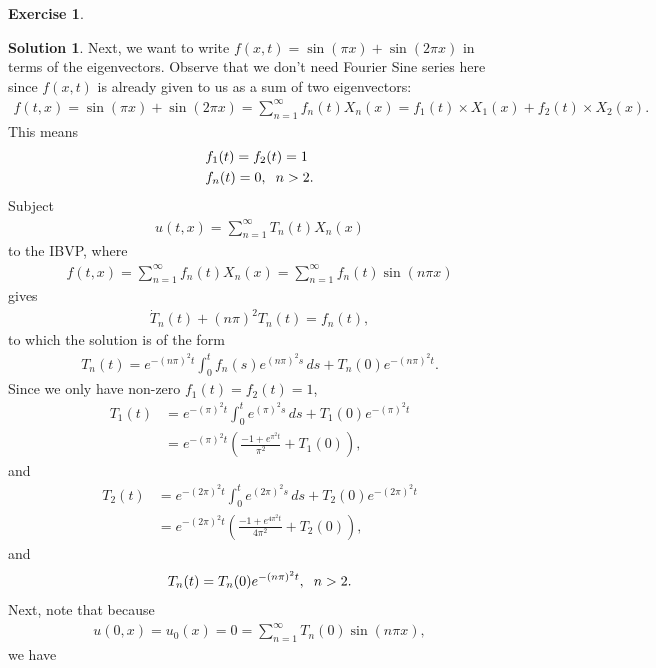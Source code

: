 \documentclass{book}
\theoremstyle{definition}
\newtheorem*{exer*}{Exercise}
\newtheorem*{sln*}{Solution}
\begin{document}
\begin{exer*}
\begin{sln*}
		Next, we want to write $f(x,t) = \sin(\pi x) + \sin(2\pi x)$ in terms of the eigenvectors. Observe that we don't need Fourier Sine series here since $f(x,t)$ is already given to us as a sum of two eigenvectors:
		\begin{align*}
		f(t,x) = \sin(\pi x) + \sin(2\pi x) = \sum^\infty_{n=1}f_n(t)X_n(x) = f_1(t) \times X_1(x) + f_2(t) \times X_2(x).
		\end{align*}
		This means
		\begin{align*}
		&f_1(t) = f_2(t) = 1\\
		&f_n(t) = 0, \hspace{0.2cm}n > 2.
		\end{align*}
		Subject 
		\begin{align*}
		u(t,x) = \sum^\infty_{n=1} T_n(t)X_n(x)
		\end{align*}
		to the IBVP, where
		\begin{align*}
		f(t,x) = \sum^\infty_{n=1}f_n(t)X_n(x) = \sum^\infty_{n=1}f_n(t)\sin(n\pi x)
		\end{align*}
		gives
		\begin{align*}
		\dot{T}_n(t) + (n\pi)^2T_n(t) = f_n(t),
		\end{align*}
		to which the solution is of the form
		\begin{align*}
		T_n(t) = e^{-(n\pi)^2t}\int^t_0 f_n(s)e^{(n\pi)^2s}\,ds + T_n(0)e^{-(n\pi)^2t}.
		\end{align*}
		Since we only have non-zero $f_1(t) = f_2(t) = 1$, 
		\begin{align*}
		T_1(t) &= e^{-(\pi)^2t}\int^t_0 e^{(\pi)^2s}\,ds + T_1(0)e^{-(\pi)^2t}\\
		&= e^{-(\pi)^2t}\left(\frac{-1 + e^{\pi^2t}}{\pi^2}  + T_1(0)\right),
		\end{align*}
		and 
		\begin{align*}
		T_2(t) &= e^{-(2\pi)^2t}\int^t_0 e^{(2\pi)^2s}\,ds + T_2(0)e^{-(2\pi)^2t}\\
		&= e^{-(2\pi)^2t}\left(\frac{-1 + e^{4\pi^2t}}{4\pi^2}  + T_2(0)  \right),
		\end{align*}
		and
		\begin{align*}
		T_n(t) = T_n(0)e^{-(n\pi)^2t}, \hspace{0.2cm}n > 2.
		\end{align*}
		Next, note that because 
		\begin{align*}
		u(0,x) = u_0(x) = 0 = \sum^\infty_{n=1}T_n(0)\sin(n\pi x),
		\end{align*}
		we have
		\begin{align*}

\end{align*}
\end{sln*}
\end{exer*}
\end{document}
